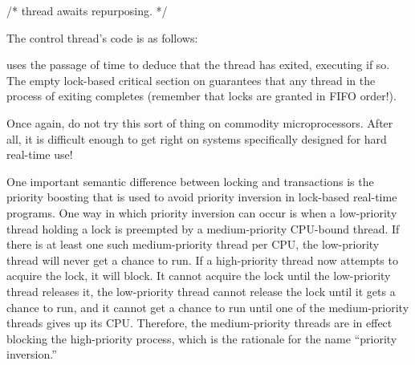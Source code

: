 {{\begin{VerbatimN}
	/* thread awaits repurposing. */
\end{VerbatimN}

	The control thread's code is as follows:

\begin{fcvlabel}
\end{fcvlabel}

	\begin{fcvref}
	 uses the passage of time to deduce that the thread
	has exited, executing  if so.
	The empty lock-based critical section on 
	guarantees that any thread in the process of exiting
	completes (remember that locks are granted in FIFO order!).
	\end{fcvref}

	Once again, do not try this sort of thing on commodity
	microprocessors.
	After all, it is difficult enough to get right on systems
	specifically designed for hard real-time use!
}\QuickQuizEndE
}

One important semantic difference between locking and transactions
is the priority boosting that is used to avoid priority inversion
in lock-based real-time programs.
One way in which priority inversion can occur is when a
low-priority thread holding a lock
is preempted by a medium-priority CPU-bound thread.
If there is at least one such medium-priority thread per CPU, the
low-priority thread will never get a chance to run.
If a high-priority thread now attempts to acquire the lock,
it will block.
It cannot acquire the lock until the low-priority thread releases it,
the low-priority thread cannot release the lock until it gets a chance
to run, and it cannot get a chance to run until one of the medium-priority
threads gives up its CPU.
Therefore, the medium-priority threads are in effect blocking the
high-priority process, which is the rationale for the name ``priority
inversion.''

